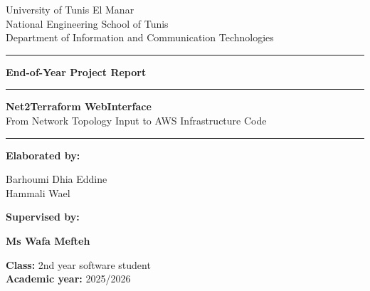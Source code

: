 \documentclass[12pt,a4paper,openany]{report}
\begin{document}
\begin{titlepage}

\begin{center}
\vspace*{1.5cm}
{\Large University of Tunis El Manar}\\
{\Large National Engineering School of Tunis}\\
{\large Department of Information and Communication Technologies}\\
\vspace{2.5cm}
\hrule
\vspace{0.9cm}
{\Large \textbf{End-of-Year Project Report}}\\
\vspace{0.7cm}
\hrule
\vspace{1.2cm}
{\Huge \textbf{Net2Terraform WebInterface}}\\
\vspace{0.2cm}
{\Large From Network Topology Input to AWS Infrastructure Code}\\
\vspace{1.2cm}
\hrule
\vspace{1.2cm}
\end{center}

\textbf{Elaborated by:}
\begin{center}
   \large{Barhoumi Dhia Eddine}\\[0.2cm]
   \large{Hammali Wael}
\end{center}

\vspace{0.7cm}
\textbf{Supervised by:}
\begin{center}
\large\textbf{Ms Wafa Mefteh}
\end{center}

\vfill
\begin{center}
   \large{\textbf{Class:} 2nd year software student}\\
   \large{\textbf{Academic year:} 2025/2026}
\end{center}

\end{titlepage}

\restoregeometry

\tableofcontents
\clearpage
\listoffigures
\clearpage
\listoftables
\clearpage
\end{document}

